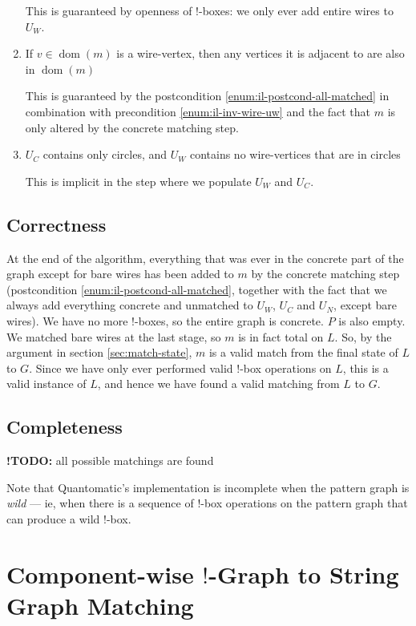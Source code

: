 \documentclass{article}
\DeclareMathOperator{\dom}{dom}
\newcommand{\TODOinline}[1]{%
\typeout{WARNING!!! there is still a TODO left}
{\color{blue}\textbf{!TODO: }#1}
}
\begin{document}
\begin{enumerate}[label=(\roman*),ref=(\roman*)]
  This is guaranteed by openness of $!$-boxes: we only ever add entire wires to $U_W$.
  \item If $v \in \dom(m)$ is a wire-vertex, then any vertices it is adjacent to are also in $\dom(m)$

  This is guaranteed by the postcondition \ref{enum:il-postcond-all-matched} in combination with precondition \ref{enum:il-inv-wire-uw} and the fact that $m$ is only altered by the concrete matching step.
  \item $U_C$ contains only circles, and $U_W$ contains no wire-vertices that are in circles

  This is implicit in the step where we populate $U_W$ and $U_C$.
\end{enumerate}

\subsection{Correctness}

At the end of the algorithm, everything that was ever in the concrete part of the graph except for bare wires has been added to $m$ by the concrete matching step (postcondition \ref{enum:il-postcond-all-matched}, together with the fact that we always add everything concrete and unmatched to $U_W$, $U_C$ and $U_N$, except bare wires).  We have no more $!$-boxes, so the entire graph is concrete.  $P$ is also empty.  We matched bare wires at the last stage, so $m$ is in fact total on $L$.  So, by the argument in section \ref{sec:match-state}, $m$ is a valid match from the final state of $L$ to $G$.  Since we have only ever performed valid $!$-box operations on $L$, this is a valid instance of $L$, and hence we have found a valid matching from $L$ to $G$.

\subsection{Completeness}

\TODOinline{all possible matchings are found}

Note that Quantomatic's implementation is incomplete when the pattern graph is \textit{wild} --- ie, when there is a sequence of $!$-box operations on the pattern graph that can produce a wild $!$-box.

\section{Component-wise $!$-Graph to String Graph Matching}
\end{document}
